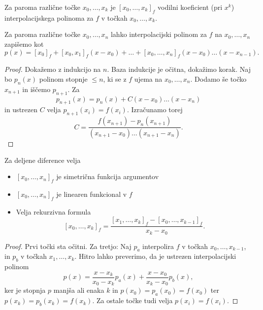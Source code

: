 

\begin{definicija}
  Za paroma različne točke $x_0, \ldots, x_k$ je 
  $[x_0, \ldots, x_k]_f$ vodilni koeficient (pri $x^k$) interpolacijskega
  polinoma za $f$ v točkah $x_0, \ldots, x_k$.
\end{definicija}

\begin{izrek}
  Za paroma različne točke $x_0, \ldots, x_n$ lahko interpolacijski polinom za
  $f$ na $x_0, \ldots, x_n$ zapišemo kot
  \[
	p(x) = [x_0]_f + [x_0, x_1]_f (x - x_0) + \ldots + [x_0, \ldots, x_n]_f (x-x_0)
	\ldots (x-x_{n-1}).
  \]
\end{izrek}

\begin{proof}
  Dokažemo z indukcijo na $n$.
  Baza indukcije je očitna, dokažimo korak.
  Naj bo $p_n(x)$ polinom stopnje $\le n$, ki se z $f$ ujema na $x_0, \ldots,
  x_n$.
  Dodamo še točko $x_{n+1}$ in iščemo $p_{n+1}$.
  Za
  \[
	p_{n+1}(x) = p_n(x) + C (x - x_0) \ldots (x - x_n)
  \]
  in ustrezen $C$ velja $p_{n+1}(x_i) = f(x_i)$.
  Izračunamo torej
  \[
	C = \frac{f(x_{n+1}) - p_n(x_{n+1})}{(x_{n+1} - x_0) \ldots (x_{n+1} -
	  x_n)}.
  \]
\end{proof}


\begin{izrek}
  Za deljene diference velja
  \begin{itemize}
  \item $[x_0, \ldots, x_n]_f$ je simetrična funkcija argumentov
  \item $[x_0, \ldots, x_n]_f$ je linearen funkcional v $f$
  \item Velja rekurzivna formula
	\[
	  [x_0, \ldots, x_k]_f = \frac{[x_1, \ldots, x_k]_f - [x_0, \ldots,
		x_{k-1}]_f}{x_k - x_0}.
	\]
  \end{itemize}
\end{izrek}

\begin{proof}
  Prvi točki sta očitni.
  Za tretjo:
  Naj $p_a$ interpolira $f$ v točkah $x_0, \ldots, x_{k-1}$, in $p_b$ v točkah
  $x_1, \ldots, x_k$.
  Hitro lahko preverimo, da je ustrezen interpolacijski polinom
  \[
	p(x) = \frac{x-x_k}{x_0 - x_k} p_a(x) + \frac{x-x_0}{x_k - x_0} p_b(x),
  \]
  ker je stopnja $p$ manjša ali enaka $k$ in $p(x_0) = p_a(x_0) = f(x_0)$ ter
  $p(x_k) = p_b(x_k) = f(x_k)$.
  Za ostale točke tudi velja $p(x_i) = f(x_i)$.
\end{proof}

